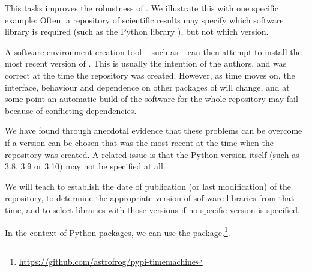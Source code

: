 \begin{task}[
  title=repo2docker development,
  id=repo2docker-timemachine,
  lead=SRL,
  PM=12,
  wphases={0-24!0.5},
  partners={QS}
]

This tasks improves the robustness of \repotodocker{}. We illustrate this with one specific example: 
Often, a repository of scientific results may
specify which software library is required (such as the Python library
), but not which version.

A software environment creation tool -- such as \repotodocker{} -- can then
attempt to install the most recent version of . This is
usually the intention of the authors, and was correct at the time the repository
was created. However, as time moves on, the interface, behaviour and dependence
on other packages of  will change, and at some point an
automatic build of the software for the whole repository may fail because of
conflicting dependencies.

We have found through anecdotal evidence that these problems can be
overcome if a  version can be chosen that was the
most recent at the time when the repository was created. A related
issue is that the Python version itself (such as 3.8, 3.9 or 3.10) may
not be specified at all.

We will teach \repotodocker{} to establish the date of publication
(or last modification) of the repository, to determine the appropriate version
of software libraries from that time, and to select libraries with those
versions if no specific version is specified.

In the context of Python packages, we can use the
package.\footnote{\url{https://github.com/astrofrog/pypi-timemachine}}.

\end{task}
